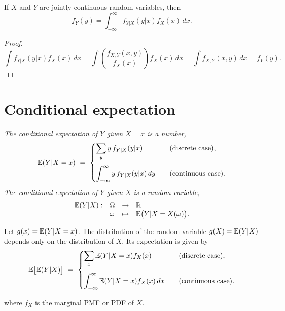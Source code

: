 
\begin{theorem}%
If $X$ and $Y$ are jointly continuous random variables, then 
\[
\displaystyle f_Y(y) = \int_{-\infty}^{\infty} f_{Y|X}(y|x) f_X(x)\,dx.
\]
\end{theorem}

\begin{proof}
\[
\int f_{Y|X}(y|x) f_X(x)\,dx 
	= \int \left(\frac{f_{X,Y}(x,y)}{f_X(x)}\right) f_X(x)\,dx
	= \int f_{X,Y}(x,y)\,dx
	= f_Y(y).
\]
\end{proof}

\section{Conditional expectation}
\begin{definition}
\ben
\it The \emph{conditional expectation of $Y$ given $X=x$} is a number,%
\[
\mathbb{E}(Y|X=x) \ =\  
	\begin{cases}
	\displaystyle\sum_y y\,f_{Y|X}(y|x)								& \text{(discrete case),} \\[4ex]
	\displaystyle\int_{-\infty}^{\infty} y\,f_{Y|X}(y|x)\,dy\quad		& \text{(continuous case).}
	\end{cases}
\]
\it The \emph{conditional expectation of $Y$ given $X$} is a random variable,
\[\begin{array}{llll}
\mathbb{E}(Y|X):	& \Omega 	& \to 		& \mathbb{R} \\
				& \omega	& \mapsto 	& \mathbb{E}\big(Y|X=X(\omega)\big).
\end{array}\]
\een
\end{definition}

\begin{remark}
Let $g(x) = \mathbb{E}(Y|X=x)$. The distribution of the random variable $g(X)=\mathbb{E}(Y|X)$ depends only on the distribution of $X$. Its expectation is given by
\[
\mathbb{E}\big[\mathbb{E}(Y|X)\big] \ =\  
	\begin{cases}
	\displaystyle\sum_x \mathbb{E}(Y|X=x)f_X(x)								& \text{(discrete case),} \\[4ex]
	\displaystyle\int_{-\infty}^{\infty} \mathbb{E}(Y|X=x)f_X(x)\,dx\quad		& \text{(continuous case).}
	\end{cases}
\]

where $f_X$ is the marginal PMF or PDF of $X$.
\end{remark}



